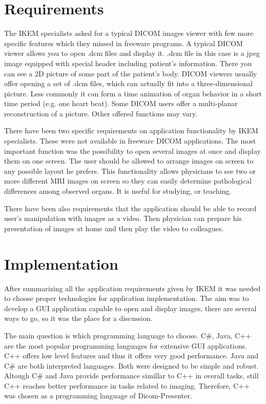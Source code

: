 \section{Requirements}
The IKEM specialists asked for a typical DICOM images viewer with few more specific features which they missed in freeware programs. A typical DICOM viewer allows you to open .dcm files and display it. .dcm file in this case is a jpeg image equipped with special header including patient's information. There you can see a 2D picture of some part of the patient's body. DICOM viewers usually offer opening a set of .dcm files, which can actually fit into a three-dimensional picture. Less commonly it can form a time animation of organ behavior in a short time period (e.g. one heart beat). Some DICOM users offer a multi-planar reconstruction of a picture. Other offered functions may vary.

There have been two specific requirements on application functionality by IKEM specialists. These were not available in freeware DICOM applications. The most important function was the possibility to open several images at once and display them on one screen. The user should be allowed to arrange images on screen to any possible layout he prefers. This functionality allows physicians to see two or more different MRI images on screen so they can easily determine pathological differences among observed organs. It is useful for studying, or teaching.

There have been also requirements that the application should be able to record user's manipulation with images as a video. Then physician can prepare his presentation of images at home and then play the video to colleagues.

\section{Implementation}
After summarizing all the application requirements given by IKEM it was needed to choose proper technologies for application implementation. The aim was to develop a GUI application capable to open and display images, there are several ways to go, so it was the place for a discussion. 

The main question is which programming language to choose. C\#, Java, C++ are the most popular programming languages for extensive GUI applications. C++ offers low level features and thus it offers very good performance. Java and C\# are both interpreted languages. Both were designed to be simple and robust. Altough C\# and Java provide performance simillar to C++ in overall tasks, still C++ reaches better performance in tasks related to imaging. Therefore, C++ was chosen as a programming language of Dicom-Presenter.

